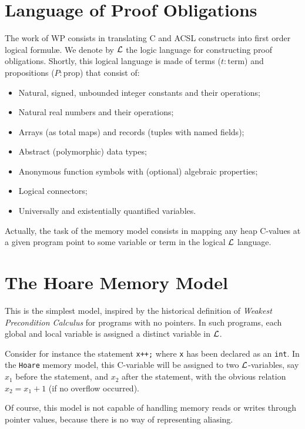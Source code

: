 \section{Language of Proof Obligations}
\label{wp-lang}

The work of \textsf{WP} consists in translating \textsf{C} and
\textsf{ACSL} constructs into first order logical formul{\ae}. We
denote by $\cal{L}$ the logic language for constructing proof
obligations.  Shortly, this logical language is made of terms
($t:\mathrm{term}$) and propositions ($P:\mathrm{prop}$) that consist of:
\begin{itemize}
\item Natural, signed, unbounded integer constants and their operations;
\item Natural real numbers and their operations;
\item Arrays (as total maps) and records (tuples with named fields);
\item Abstract (polymorphic) data types;
\item Anonymous function symbols with (optional) algebraic properties;
\item Logical connectors;
\item Universally and existentially quantified variables.
\end{itemize}

Actually, the task of the memory model consists in mapping any
heap \textsf{C}-values at a given program point to some variable or term
in the logical $\cal{L}$ language.

\section{The Hoare Memory Model}
\label{wp-model-logical}

This is the simplest model, inspired by the historical definition of
\emph{Weakest Precondition Calculus} for programs with no pointers. In
such programs, each global and local variable is assigned a
distinct variable in $\cal{L}$.

Consider for instance the statement \lstinline{x++;} where
\lstinline{x} has been declared as an \lstinline{int}. In the
\lstinline{Hoare} memory model, this \textsf{C}-variable will be
assigned to two $\cal{L}$-variables, say $x_1$ before the statement, and
$x_2$ after the statement, with the obvious relation $x_2 = x_1+1$ (if
no overflow occurred).

Of course, this model is not capable of handling memory reads or writes
through pointer values, because there is no way of representing
aliasing.

